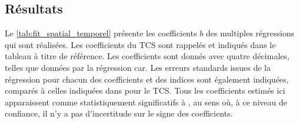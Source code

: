 \documentclass[../main.tex]{subfiles}
\begin{document}
\subsection{Résultats}\label{sec:apport_resultat}

Le \cref{tab:fit_spatial_temporel} présente les coefficients $b$ des multiples régressions qui sont réalisées. Les coefficients du TCS sont rappelés et indiqués
dans le tableau à titre de référence. Les coefficients sont donnés avec quatre décimales, telles que données par la régression car. Les erreurs standards issues
de la régression pour chacun des coefficients et des indices sont également indiquées,
comparés à celles indiquées dans \textcite{tippett_poisson_2011} pour le TCS. Tous les coefficients estimés ici apparaissent comme statistiquement significatifs
à , au sens où, à ce niveau de confiance, il n'y a pas d'incertitude sur le signe des coefficients.
\end{document}
